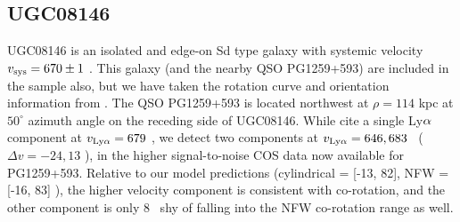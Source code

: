 \subsection{UGC08146} \label{UGC08146}
UGC08146 is an isolated and edge-on Sd type galaxy with systemic velocity $v_{\rm sys} = 670 \pm 1$ \kms. This galaxy (and the nearby QSO PG1259+593) are included in the \cite{cote2005} sample also, but we have taken the rotation curve and orientation information from \cite{rhee1996}. The QSO PG1259+593 is located northwest at $\rho = 114$ kpc at $50^{\circ}$ azimuth angle on the receding side of UGC08146. While \cite{cote2005} cite a single Ly$\rm \alpha$ component at $v_{\rm Ly\alpha} = 679$ \kms, we detect two components at $v_{\rm Ly\alpha} = 646, 683$ \kms~($\Delta v = -24, 13$ \kms), in the higher signal-to-noise COS data now available for PG1259+593. Relative to our model predictions (cylindrical = [-13, 82], NFW = [-16, 83] \kms), the higher velocity component is consistent with co-rotation, and the other component is only 8 \kms~shy of falling into the NFW co-rotation range as well.






%





\clearpage
